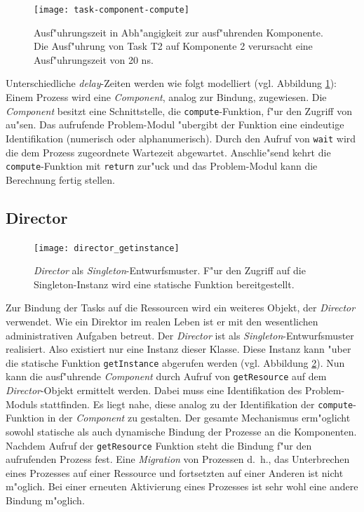 \begin{figure}
\begin{center}
\texttt{[image: task-component-compute]}
\caption{Ausf"uhrungszeit in Abh"angigkeit zur ausf"uhrenden Komponente. Die
  Ausf"uhrung von Task T2 auf Komponente 2 verursacht eine Ausf"uhrungszeit von
  20 ns.}
\label{fig:task-component-compute}
\end{center}
\end{figure}
Unterschiedliche \emph{delay}-Zeiten werden wie folgt modelliert (vgl. Abbildung \ref{fig:task-component-compute}):
Einem Prozess wird eine \emph{Component}, analog zur Bindung,
zugewiesen. Die \emph{Component} besitzt eine Schnittstelle, die
\verb|compute|-Funktion, f"ur den Zugriff von au"sen. Das aufrufende
Problem-Modul "ubergibt der Funktion eine eindeutige Identifikation (numerisch
oder alphanumerisch). Durch den Aufruf von \verb|wait| wird die dem Prozess
zugeordnete Wartezeit abgewartet. Anschlie"send kehrt die
\verb|compute|-Funktion mit \verb|return| zur"uck und das Problem-Modul kann
die Berechnung fertig stellen. 


\subsection{Director}
\begin{figure}
\begin{center}
\texttt{[image: director\_getinstance]}
\caption{\emph{Director} als \emph{Singleton}-Entwurfsmuster. F"ur den Zugriff
  auf die Singleton-Instanz wird eine statische Funktion bereitgestellt.}
\label{fig:director_getinstance}
\end{center}
\end{figure}

Zur Bindung der Tasks auf die Ressourcen wird ein weiteres Objekt, der
\emph{Director} verwendet. Wie ein Direktor im realen Leben ist er mit den
wesentlichen administrativen Aufgaben betreut. Der \emph{Director} ist als
\emph{Singleton}-Entwurfsmuster realisiert. Also existiert nur eine Instanz
dieser Klasse.  Diese Instanz kann "uber die statische Funktion
\verb|getInstance| abgerufen werden (vgl. Abbildung
\ref{fig:director_getinstance}). Nun kann die ausf"uhrende
\emph{Component} durch Aufruf von \verb|getResource| auf dem
\emph{Director}-Objekt ermittelt werden. Dabei muss eine Identifikation des
Problem-Moduls stattfinden. Es liegt nahe, diese analog zu der Identifikation
der \verb|compute|-Funktion in der \emph{Component} zu gestalten. Der gesamte
Mechanismus erm"oglicht sowohl statische als auch dynamische Bindung der
Prozesse an die Komponenten. Nachdem Aufruf der \verb|getResource| Funktion
steht die Bindung f"ur den aufrufenden Prozess fest. Eine
\emph{Migration} von Prozessen d.~h., das Unterbrechen eines Prozesses auf einer Ressource
und fortsetzten auf einer Anderen ist nicht m"oglich. Bei einer erneuten
Aktivierung eines Prozesses ist sehr wohl eine andere Bindung m"oglich. 

